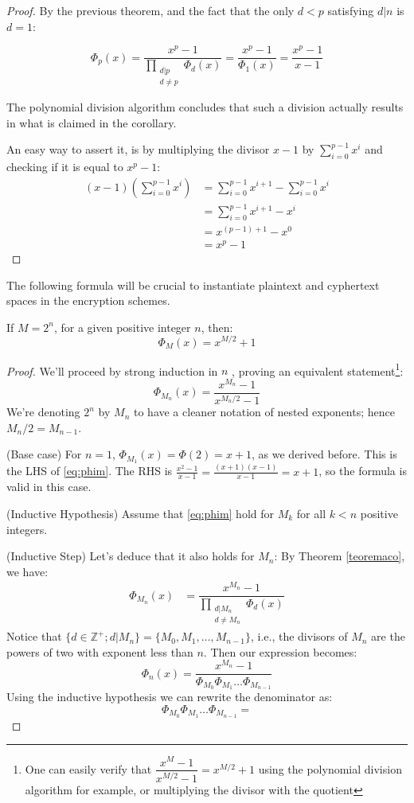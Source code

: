 \begin{proof}
By the previous theorem, and the fact that the only $d<p$ satisfying $d|n$ is $d=1$:

$$\Phi_p(x)=\dfrac{x^p-1}{\displaystyle\prod_{\substack{d|p\\d\neq p}}\Phi_d(x)}=\dfrac{x^p-1}{\Phi_1(x)}=\dfrac{x^p-1}{x-1}$$

The polynomial division algorithm concludes that such a division actually results in what is claimed in the corollary.

An easy way to assert it, is by multiplying the divisor $x-1$ by $\displaystyle\sum_{i=0}^{p-1}x^i$ and checking if it is equal to $x^p-1$:
\begin{align*}
    (x-1)\left(\sum_{i=0}^{p-1}x^i\right)&=\sum_{i=0}^{p-1}x^{i+1}-\sum_{i=0}^{p-1}x^i\\
    &=\sum_{i=0}^{p-1}x^{i+1}-x^{i}\\
    &=x^{(p-1)+1}-x^{0}\\
    &=x^{p}-1
\end{align*}
\end{proof}
The following formula will be crucial to instantiate plaintext and cyphertext spaces in the encryption schemes.
\begin{corollary}
If $M=2^n$, for a given positive integer $n$, then:
$$\Phi_M(x)=x^{M/2}+1$$
\end{corollary}
\begin{proof}
We'll proceed by strong induction in $n$ \cite{herstein1996abstract},  proving an equivalent statement\footnote{One can easily verify that $\dfrac{x^{M}-1}{x^{M/2}-1} = x^{M/2}+1$ using the polynomial division algorithm for example, or multiplying the divisor with the quotient}: 
\begin{equation}
\label{eq:phim}
    \Phi_{M_n}(x) = \dfrac{x^{M_n}-1}{x^{M_n/2}-1}
\end{equation}
We're denoting $2^n$ by $M_n$ to have a cleaner notation of nested exponents; hence $M_n/2=M_{n-1}$.

(Base case) For $n=1$, $\Phi_{M_1}(x)=\Phi(2)=x+1$, as we derived before. This is the LHS of \ref{eq:phim}. The RHS is $\frac{x^2-1}{x-1}=\frac{(x+1)(x-1)}{x-1}=x+1$, so the formula is valid in this case.

(Inductive Hypothesis) Assume that \ref{eq:phim} hold for $M_k$ for all $k<n$ positive integers.

(Inductive Step) Let's deduce that it also holds for $M_n$: By Theorem  \ref{teoremaco}, we have:
\begin{align*}
    \Phi_{M_n}(x) &= \dfrac{x^{M_n}-1}{\displaystyle\prod_{\substack{d|M_n\\d\neq M_n}}\Phi_d(x)}
\end{align*}
Notice that $\{d\in\mathbb{Z}^+;d|M_n\} = \{M_0,M_1,\ldots,M_{n-1}\}$, i.e., the divisors of $M_n$ are the powers of two with exponent less than $n$. Then our expression becomes:
$$\Phi_n(x) = \dfrac{x^{M_n}-1}{\Phi_{M_0}\Phi_{M_1}\ldots\Phi_{M_{n-1}}}$$
Using the inductive hypothesis we can rewrite the denominator as:
$$\Phi_{M_0}\Phi_{M_1}\ldots\Phi_{M_{n-1}}=$$



\end{proof}

